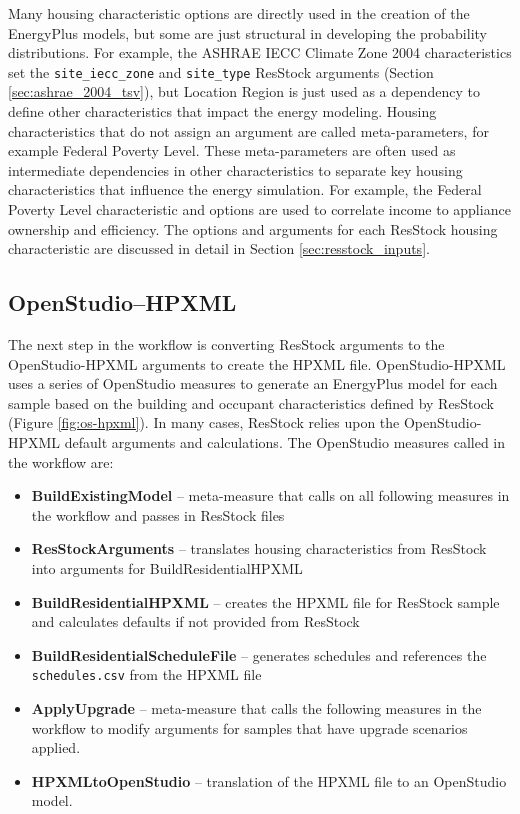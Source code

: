 Many housing characteristic options are directly used in the creation of the EnergyPlus models, but some are just structural in developing the probability distributions. For example, the ASHRAE IECC Climate Zone 2004 characteristics set the \texttt{site\_iecc\_zone} and \texttt{site\_type} ResStock arguments (Section \ref{sec:ashrae_2004_tsv}), but Location Region is just used as a dependency to define other characteristics that impact the energy modeling. Housing characteristics that do not assign an argument are called meta-parameters, for example Federal Poverty Level. These meta-parameters are often used as intermediate dependencies in other characteristics to separate key housing characteristics that influence the energy simulation. For example, the Federal Poverty Level characteristic and options are used to correlate income to appliance ownership and efficiency. The options and arguments for each ResStock housing characteristic are discussed in detail in Section \ref{sec:resstock_inputs}.

\subsection{OpenStudio--HPXML}

The next step in the workflow is converting ResStock arguments to the OpenStudio-HPXML arguments to create the HPXML file. OpenStudio-HPXML uses a series of OpenStudio measures to generate an EnergyPlus model for each sample based on the building and occupant characteristics defined by ResStock (Figure \ref{fig:os-hpxml}). In many cases, ResStock relies upon the OpenStudio-HPXML default arguments and calculations. The OpenStudio measures called in the workflow are:

\begin{itemize}
    \item \textbf{BuildExistingModel} -- meta-measure that calls on all following measures in the workflow and passes in ResStock files
    \item \textbf{ResStockArguments} -- translates housing characteristics from ResStock into arguments for BuildResidentialHPXML
    \item \textbf{BuildResidentialHPXML} -- creates the HPXML file for ResStock sample and calculates defaults if not provided from ResStock
    \item \textbf{BuildResidentialScheduleFile} -- generates schedules and references the \texttt{schedules.csv} from the HPXML file
    \item \textbf{ApplyUpgrade} -- meta-measure that calls the following measures in the workflow to modify arguments for samples that have upgrade scenarios applied.
    \item \textbf{HPXMLtoOpenStudio} -- translation of the HPXML file to an OpenStudio model.
\end{itemize}

